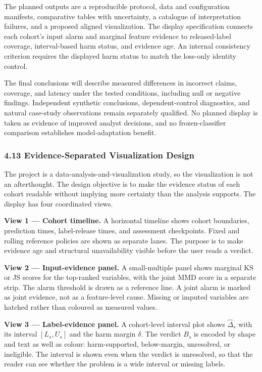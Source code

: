 \documentclass[
]{article}
\begin{document}
The planned outputs are a reproducible protocol, data and configuration
manifests, comparative tables with uncertainty, a catalogue of
interpretation failures, and a proposed aligned visualization. The
display specification connects each cohort's input alarm and marginal
feature evidence to released-label coverage, interval-based harm status,
and evidence age. An internal consistency criterion requires the
displayed harm status to match the loss-only identity control.

The final conclusions will describe measured differences in incorrect
claims, coverage, and latency under the tested conditions, including
null or negative findings. Independent synthetic conclusions,
dependent-control diagnostics, and natural case-study observations
remain separately qualified. No planned display is taken as evidence of
improved analyst decisions, and no frozen-classifier comparison
establishes model-adaptation benefit.

\hypertarget{evidence-separated-visualization-design}{%
\subsubsection{4.13 Evidence-Separated Visualization
Design}\label{evidence-separated-visualization-design}}

The project is a data-analysis-and-visualization study, so the
visualization is not an afterthought. The design objective is to make
the evidence status of each cohort readable without implying more
certainty than the analysis supports. The display has four coordinated
views.

\textbf{View 1 --- Cohort timeline.} A horizontal timeline shows cohort
boundaries, prediction times, label-release times, and assessment
checkpoints. Fixed and rolling reference policies are shown as separate
lanes. The purpose is to make evidence age and structural unavailability
visible before the user reads a verdict.

\textbf{View 2 --- Input-evidence panel.} A small-multiple panel shows
marginal KS or JS scores for the top-ranked variables, with the joint
MMD score in a separate strip. The alarm threshold is drawn as a
reference line. A joint alarm is marked as joint evidence, not as a
feature-level cause. Missing or imputed variables are hatched rather
than coloured as measured values.

\textbf{View 3 --- Label-evidence panel.} A cohort-level interval plot
shows \(\widehat{\Delta}_s\) with its interval \([L_s,U_s]\) and the
harm margin \(\delta\). The verdict \(B_s\) is encoded by shape and text
as well as colour: harm-supported, below-margin, unresolved, or
ineligible. The interval is shown even when the verdict is unresolved,
so that the reader can see whether the problem is a wide interval or
missing labels.
\end{document}
